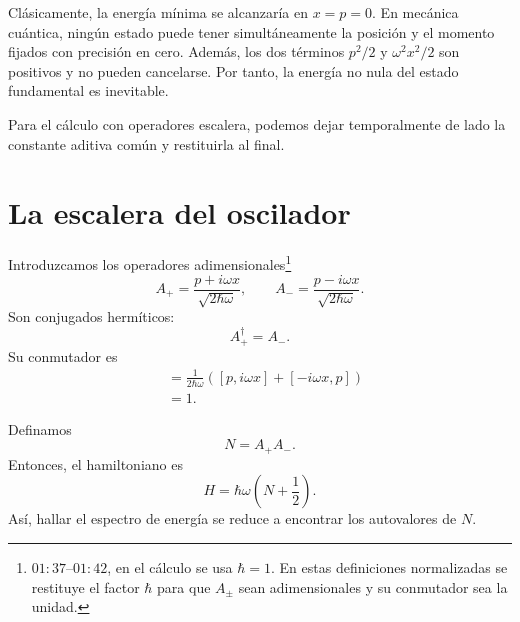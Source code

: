 Clásicamente, la energía mínima se alcanzaría en \(x=p=0\). En mecánica cuántica, ningún estado puede tener simultáneamente la posición y el momento fijados con precisión en cero. Además, los dos términos \(p^2/2\) y \(\omega^2x^2/2\) son positivos y no pueden cancelarse. Por tanto, la energía no nula del estado fundamental es inevitable.

Para el cálculo con operadores escalera, podemos dejar temporalmente de lado la constante aditiva común y restituirla al final.

\begin{classroomqa}
\end{classroomqa}

\section{La escalera del oscilador}

Introduzcamos los operadores adimensionales\footnote{\(01{:}37\)--\(01{:}42\), en el cálculo se usa \(\hbar=1\). En estas definiciones normalizadas se restituye el factor \(\hbar\) para que \(A_\pm\) sean adimensionales y su conmutador sea la unidad.}
\begin{equation}
A_+=\frac{p+i\omega x}{\sqrt{2\hbar\omega}},
\qquad
A_-=\frac{p-i\omega x}{\sqrt{2\hbar\omega}}.
\end{equation}
Son conjugados hermíticos:
\begin{equation}
A_+^\dagger=A_-.
\end{equation}
Su conmutador es
\begin{align}
[A_-,A_+]
&=\frac{1}{2\hbar\omega}
\left([p,i\omega x]+[-i\omega x,p]\right) \\
&=1.
\end{align}

Definamos
\begin{equation}
N=A_+A_-.
\end{equation}
Entonces, el hamiltoniano es
\begin{equation}
H=\hbar\omega\left(N+\frac{1}{2}\right).
\end{equation}
Así, hallar el espectro de energía se reduce a encontrar los autovalores de \(N\).

